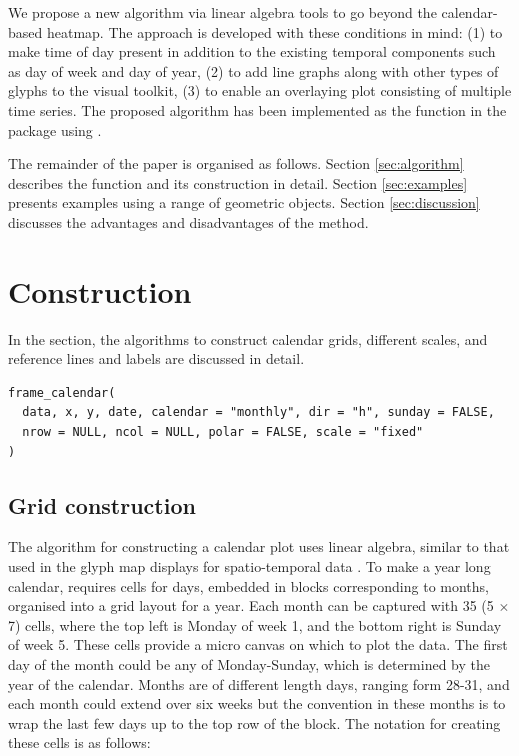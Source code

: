 \documentclass[article]{jss}
\begin{document}
We propose a new algorithm via linear algebra tools to go beyond the
calendar-based heatmap. The approach is developed with these conditions
in mind: (1) to make time of day present in addition to the existing
temporal components such as day of week and day of year, (2) to add line
graphs along with other types of glyphs to the visual toolkit, (3) to
enable an overlaying plot consisting of multiple time series. The
proposed algorithm has been implemented as the 
function in the  package \citep{R-sugrrants} using
 \citep{R-base}.

The remainder of the paper is organised as follows. Section
\ref{sec:algorithm} describes the  function and its
construction in detail. Section \ref{sec:examples} presents examples
using a range of geometric objects. Section \ref{sec:discussion}
discusses the advantages and disadvantages of the method.

\section{Construction}\label{construction}

\label{sec:algorithm}

In the section, the algorithms to construct calendar grids, different
scales, and reference lines and labels are discussed in detail.

\begin{verbatim}
frame_calendar(
  data, x, y, date, calendar = "monthly", dir = "h", sunday = FALSE, 
  nrow = NULL, ncol = NULL, polar = FALSE, scale = "fixed"
)
\end{verbatim}

\subsection{Grid construction}\label{grid-construction}

The algorithm for constructing a calendar plot uses linear algebra,
similar to that used in the glyph map displays for spatio-temporal data
\citep{Wickham2012glyph}. To make a year long calendar, requires cells
for days, embedded in blocks corresponding to months, organised into a
grid layout for a year. Each month can be captured with 35 (5 \(\times\)
7) cells, where the top left is Monday of week 1, and the bottom right
is Sunday of week 5. These cells provide a micro canvas on which to plot
the data. The first day of the month could be any of Monday-Sunday,
which is determined by the year of the calendar. Months are of different
length days, ranging form 28-31, and each month could extend over six
weeks but the convention in these months is to wrap the last few days up
to the top row of the block. The notation for creating these cells is as
follows:
\end{document}
